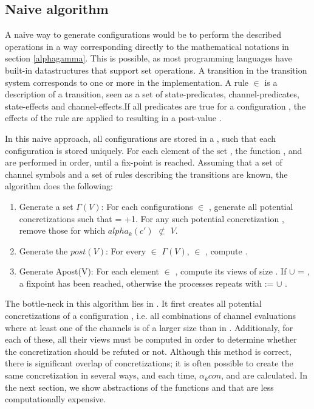 \subsection{Naive algorithm}
A naive way to generate configurations would be to perform the described operations in a way corresponding directly to the mathematical notations in section \ref{alphagamma}. This is possible, as most programming languages have built-in datastructures that support set operations. A transition in the transition system corresponds to one or more  in the implementation. A rule  $\in$  is a description of a transition, seen as a set of state-predicates, channel-predicates, state-effects and channel-effects.If all predicates are true for a configuration , the effects of the rule are applied to  resulting in a post-value . 

In this naive approach, all configurations are stored in a , such that each configuration is stored uniquely. For each element  of the set , the function ,  and  are performed in order, until a fix-point is reached. Assuming that a set of channel symbols and a set of rules  describing the transitions are known, the algorithm does the following:

\begin{enumerate}
\item
Generate a set $\Gamma(V)$: For each configurations  $\in$ , generate all potential concretizations  such that  = +1. For any such potential concretization , remove those for which $alpha_k(c')$ $\not\subset$ $V$.

\item
Generate the $post(V)$: For every  $\in$ $\Gamma(V)$,  $\in$ , compute .

\item
Generate Apost(V): For each element  $\in$ , compute its views of size . If  $\cup$  = , a fixpoint has been reached, otherwise the processes repeats with  :=  $\cup$ .
\end{enumerate}

The bottle-neck in this algorithm lies in . It first creates all potential concretizations of a configuration , i.e. all combinations of channel evaluations where at least one of the channels is of a larger size than in . Additionaly, for each of these, all their views must be computed in order to determine whether the concretization should be refuted or not. Although this method is correct, there is significant overlap of concretizations; it is often possible to create the same concretization  in several ways, and each time, $\alpha_k{con}$,  and  are calculated. In the next section, we show abstractions of the functions  and  that are less computationally expensive.


